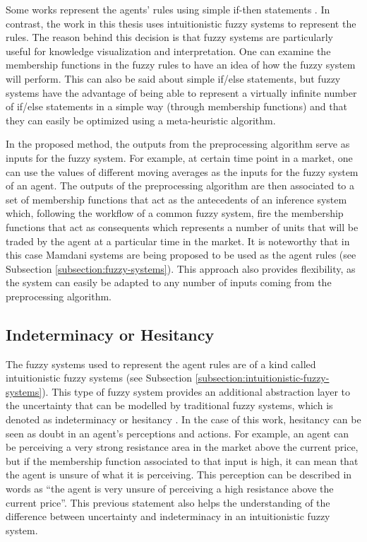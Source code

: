 Some works represent the agents' rules using simple if-then statements
\cite{Niazi2011} \cite{Pellizzari2007}. In contrast, the work in this thesis
uses intuitionistic fuzzy systems to represent the rules. The reason behind this
decision is that fuzzy systems are particularly useful for knowledge
visualization and interpretation. One can examine the membership functions in
the fuzzy rules to have an idea of how the fuzzy system will perform. This can
also be said about simple if/else statements, but fuzzy systems have the
advantage of being able to represent a virtually infinite number of if/else
statements in a simple way (through membership functions) and that they can
easily be optimized using a meta-heuristic algorithm.

In the proposed method, the outputs from the preprocessing algorithm serve as
inputs for the fuzzy system. For example, at certain time point in a market, one
can use the values of different moving averages as the inputs for the fuzzy
system of an agent. The outputs of the preprocessing algorithm are then
associated to a set of membership functions that act as the antecedents of an
inference system which, following the workflow of a common fuzzy system, fire
the membership functions that act as consequents which represents a number of
units that will be traded by the agent at a particular time in the market. It is
noteworthy that in this case Mamdani systems are being proposed to be used as
the agent rules (see Subsection \ref{subsection:fuzzy-systems}). This approach
also provides flexibility, as the system can easily be adapted to any number of
inputs coming from the preprocessing algorithm.

\subsection{Indeterminacy or Hesitancy}
\label{subsection:indeterminacy-or-hesitancy}

The fuzzy systems used to represent the agent rules are of a kind called
intuitionistic fuzzy systems (see Subsection
\ref{subsection:intuitionistic-fuzzy-systems}). This type of fuzzy system
provides an additional abstraction layer to the uncertainty that can be modelled
by traditional fuzzy systems, which is denoted as indeterminacy or hesitancy
\cite{Atanassov1986}. In the case of this work, hesitancy can be seen as doubt
in an agent's perceptions and actions. For example, an agent can be perceiving a
very strong resistance area in the market above the current price, but if the
membership function associated to that input is high, it can mean that the agent
is unsure of what it is perceiving. This perception can be described in words as
``the agent is very unsure of perceiving a high resistance above the current
price''. This previous statement also helps the understanding of the difference
between uncertainty and indeterminacy in an intuitionistic fuzzy system.

